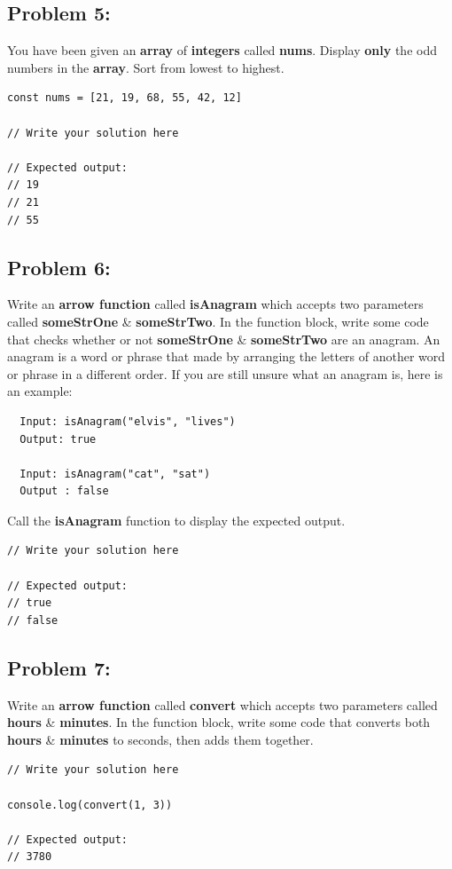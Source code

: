 \documentclass{article}
\begin{document}
\subsection*{Problem 5:}
You have been given an \textbf{array} of \textbf{integers} called \textbf{nums}. Display \textbf{only} the odd numbers in the \textbf{array}. Sort from lowest to highest.

\begin{verbatim}
const nums = [21, 19, 68, 55, 42, 12]
      
// Write your solution here

// Expected output:
// 19
// 21
// 55
\end{verbatim}

\subsection*{Problem 6:}
Write an \textbf{arrow function} called \textbf{isAnagram} which accepts two parameters called \textbf{someStrOne} \& \textbf{someStrTwo}. In the function block, write some code that checks whether or not \textbf{someStrOne} \& \textbf{someStrTwo} are an anagram. An anagram is a word or phrase that made by arranging the letters of another word or phrase in a different order. If you are still unsure what an anagram is, here is an example:

\begin{verbatim}
  Input: isAnagram("elvis", "lives")
  Output: true

  Input: isAnagram("cat", "sat")
  Output : false
\end{verbatim}

Call the \textbf{isAnagram} function to display the expected output.

\begin{verbatim}
// Write your solution here

// Expected output:
// true
// false
\end{verbatim}

\subsection*{Problem 7:}
Write an \textbf{arrow function} called \textbf{convert} which accepts two parameters called \textbf{hours} \& \textbf{minutes}. In the function block, write some code that converts both \textbf{hours} \& \textbf{minutes} to seconds, then adds them together.

\begin{verbatim}
// Write your solution here

console.log(convert(1, 3))

// Expected output:
// 3780
\end{verbatim}
\end{document}
